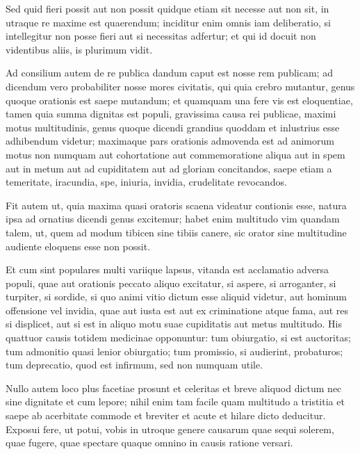 Sed quid fieri possit aut non possit quidque etiam sit necesse aut non sit, in utraque re maxime est quaerendum; inciditur enim omnis iam deliberatio, si intellegitur non posse fieri aut si necessitas adfertur; et qui id docuit non videntibus aliis, is plurimum vidit.

 Ad consilium autem de re publica dandum caput est nosse rem publicam; ad dicendum vero probabiliter nosse mores civitatis, qui quia crebro mutantur, genus quoque orationis est saepe mutandum; et quamquam una fere vis est eloquentiae, tamen quia summa dignitas est populi, gravissima causa rei publicae, maximi motus multitudinis, genus quoque dicendi grandius quoddam et inlustrius esse adhibendum videtur; maximaque pars orationis admovenda est ad animorum motus non numquam aut cohortatione aut commemoratione aliqua aut in spem aut in metum aut ad cupiditatem aut ad gloriam concitandos, saepe etiam a temeritate, iracundia, spe, iniuria, invidia, crudelitate revocandos.

 Fit autem ut, quia maxima quasi oratoris scaena videatur contionis esse, natura ipsa ad ornatius dicendi genus excitemur; habet enim multitudo vim quandam talem, ut, quem ad modum tibicen sine tibiis canere, sic orator sine multitudine audiente eloquens esse non possit.

 Et cum sint populares multi variique lapsus, vitanda est acclamatio adversa populi, quae aut orationis peccato aliquo excitatur, si aspere, si arroganter, si turpiter, si sordide, si quo animi vitio dictum esse aliquid videtur, aut hominum offensione vel invidia, quae aut iusta est aut ex criminatione atque fama, aut res si displicet, aut si est in aliquo motu suae cupiditatis aut metus multitudo. His quattuor causis totidem medicinae opponuntur: tum obiurgatio, si est auctoritas; tum admonitio quasi lenior obiurgatio; tum promissio, si audierint, probaturos; tum deprecatio, quod est infirmum, sed non numquam utile.

 Nullo autem loco plus facetiae prosunt et celeritas et breve aliquod dictum nec sine dignitate et cum lepore; nihil enim tam facile quam multitudo a tristitia et saepe ab acerbitate commode et breviter et acute et hilare dicto deducitur. Exposui fere, ut potui, vobis in utroque genere causarum quae sequi solerem, quae fugere, quae spectare quaque omnino in causis ratione versari.

